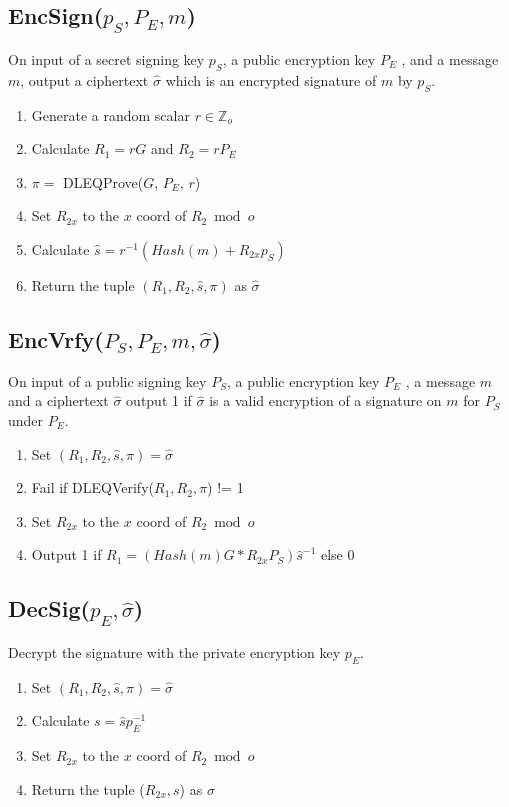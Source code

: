 \documentclass[a4paper]{article}
\begin{document}
\subsection{EncSign($p_{S}, P_{E}, m$)}
On input of a secret signing key $p_{S}$, a public encryption key $P_{E}$ , and a message $m$, output a ciphertext $\hat{\sigma}$ which is an encrypted signature of $m$ by $p_{S}$.
\begin{enumerate}
    \item Generate a random scalar $r \in \mathbb{Z}_{o}$
    \item Calculate $R_{1} = rG$ and $ R_{2} = rP_{E}$
    \item $\pi = $ DLEQProve($G$, $P_{E}$, $r$)
    \item Set $R_{2x}$ to the $x$ coord of $R_{2} \bmod o$
    \item Calculate $\hat{s} = r^{-1}(Hash(m) + R_{2x}p_{S})$
    \item Return the tuple $(R_{1}, R_{2}, \hat{s}, \pi)$ as $\hat{\sigma}$
\end{enumerate}

\subsection{EncVrfy($P_{S}, P_{E},  m, \hat{\sigma}$)}
On input of a public signing key $P_{S}$, a public encryption key $P_{E}$ , a message $m$ and a ciphertext $\hat{\sigma}$ output
1 if $\hat{\sigma}$ is a valid encryption of a signature on $m$ for $P_{S}$ under $P_{E}$.
\begin{enumerate}
    \item Set $(R_{1}, R_{2}, \hat{s}, \pi) = \hat{\sigma}$
    \item Fail if DLEQVerify($R_{1}, R_{2}, \pi$) != 1
    \item Set $R_{2x} $ to the $x$ coord of $R_{2} \bmod o$
    \item Output 1 if $R_{1} = (Hash(m)G * R_{2x}P_{S})\hat{s}^{-1}$ else 0
\end{enumerate}

\subsection{DecSig($p_{E}, \hat{\sigma}$)}
Decrypt the signature with the private encryption key $p_{E}$.
\begin{enumerate}
    \item Set $(R_{1}, R_{2}, \hat{s}, \pi) = \hat{\sigma}$
    \item Calculate $s = \hat{s}p_{E}^{-1}$
    \item Set $R_{2x}$ to the $x$ coord of $R_{2} \bmod o$
    \item Return the tuple ($R_{2x}, s$) as $\sigma$
\end{enumerate}
\end{document}
